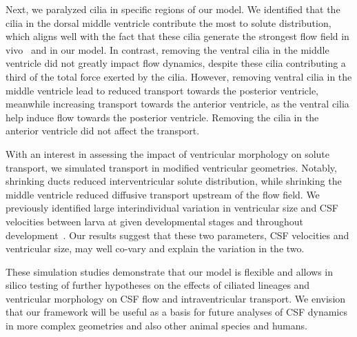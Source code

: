 \documentclass{WileyMSP-template}
\begin{document}
Next, we paralyzed cilia in specific regions of
our model. We identified that the cilia in the dorsal middle ventricle contribute
the most to solute distribution, which aligns well with the fact
that these cilia generate the strongest flow field in vivo~\cite{Olstad2019CiliaryDevelopment}
and in our model. In contrast, removing the ventral cilia in the middle ventricle
did not greatly impact flow dynamics, despite these cilia contributing a third of
the total force exerted by the cilia. However, removing ventral cilia in the middle ventricle
lead to reduced transport towards the posterior ventricle,
meanwhile increasing transport towards the anterior ventricle,
as the ventral cilia help induce flow towards the posterior ventricle.
Removing the cilia in the anterior ventricle did not affect the transport.

With an interest in assessing the impact of ventricular morphology on solute transport,
we simulated transport in modified ventricular geometries.
Notably, shrinking ducts reduced interventricular solute distribution, while shrinking
the middle ventricle reduced diffusive transport upstream of the flow field.
We previously identified large interindividual variation in ventricular size and
CSF velocities between larva at given developmental stages and throughout
development~\cite{Olstad2019CiliaryDevelopment, DGama2025MotileBrain, Jeong2024TheZebrafish}.
Our results suggest that these two parameters, CSF velocities and ventricular size,
may well co-vary and explain the variation in the two.

These simulation studies demonstrate that our model is flexible and allows in silico
testing of further hypotheses on the effects of ciliated
lineages and ventricular morphology on CSF flow and intraventricular transport.
We envision that our framework will be useful as a basis for future analyses of
CSF dynamics in more complex geometries and also other animal species and humans.
\end{document}
